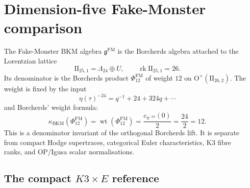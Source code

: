 \providecommand{\C}{\mathbb{C}}
\providecommand{\Z}{\mathbb{Z}}
\providecommand{\R}{\mathbb{R}}
\providecommand{\Cstar}{\C^{\times}}
\providecommand{\Auts}{\mathrm{Aut}_{s}}
\providecommand{\kch}{\kappa_{\mathrm{ch}}}
\providecommand{\kcat}{\kappa_{\mathrm{cat}}}
\providecommand{\kBKM}{\kappa_{\mathrm{BKM}}}
\providecommand{\kfib}{\kappa_{\mathrm{fiber}}}
\providecommand{\Yplus}{Y^{+}}
\providecommand{\Yminus}{Y^{-}}
\providecommand{\Yzero}{Y^{0}}
\providecommand{\Mbps}{\mathcal{M}^{+}_{\mathrm{eff}}}
\providecommand{\Mred}{\mathcal{M}^{\mathrm{red}}}
\providecommand{\Heq}{H^{\bullet}_{\mathrm{eq}}}
\providecommand{\gFM}{\mathfrak{g}^{\mathrm{FM}}}
\providecommand{\PhiFM}{\Phi_{12}^{\mathrm{FM}}}
\providecommand{\Leech}{\Lambda_{24}}
\providecommand{\IIlor}{\mathrm{II}_{25,1}}
\providecommand{\IIpar}{\mathrm{II}_{26,2}}
\providecommand{\IIbase}{\mathrm{II}_{3,27}}
\providecommand{\MukaiK}{\Lambda_{K3}}
\providecommand{\ChirAlg}{\mathrm{ChirAlg}}
\providecommand{\Dfive}{D_5}
\providecommand{\PhiOP}{\Phi_{10}^{\mathrm{OP}}}
\providecommand{\Phiun}{\Phi_{10}^{\mathrm{un}}}
\providecommand{\ZDTred}{Z_{\mathrm{DT},\mathrm{red}}}

\section*{Dimension-five Fake-Monster comparison}
\label{sec:k3k3e-d5-gluing}

The Fake-Monster BKM algebra $\gFM$ is the Borcherds algebra attached to
the Lorentzian lattice
\[
  \IIlor=\Leech\oplus U,
  \qquad \operatorname{rk}\IIlor=26 .
\]
Its denominator is the Borcherds product $\PhiFM$ of weight $12$ on
$\mathrm O^{+}(\IIpar)$. The weight is fixed by the input
\[
  \eta(\tau)^{-24}=q^{-1}+24+324q+\cdots
\]
and Borcherds' weight formula:
\[
  \kBKM(\PhiFM)
  =\operatorname{wt}(\PhiFM)
  =\frac{c_{\eta^{-24}}(0)}{2}
  =\frac{24}{2}
  =12 .
\]
This is a denominator invariant of the orthogonal Borcherds lift. It is
separate from compact Hodge supertraces, categorical Euler
characteristics, K3 fibre ranks, and OP/Igusa scalar normalisations.

\subsection*{The compact \texorpdfstring{$K3\times E$}{K3 x E} reference}
\label{subsec:k3e-reference-constants}

